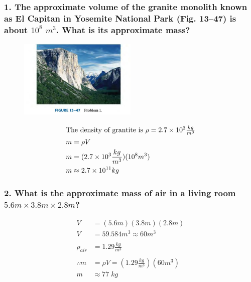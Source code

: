 \documentclass{article}
\begin{document}
\subsubsection*{
    1. The approximate volume of the granite monolith known as El Capitan
    in Yosemite National Park (Fig. 13–47) is about $10^8$ $m^3$. 
    What is its approximate mass?
}
\begin{figure}[h]
    \begin{center}
        \includegraphics[width=0.5\textwidth]{figures/p1.jpg}
    \end{center}
\end{figure}
\begin{align*}
    \intertext{The density of grantite is $\rho = 2.7 \times 10^3 \frac{kg}{m^3}$}
    m &= \rho V \\
    m &= (2.7 \times 10^3 \frac{kg}{m^3})(10^8 m^3) \\
    m &\approx 2.7 \times 10^{11} kg
\end{align*}
\subsubsection*{
    2.  What is the approximate mass of air in a living room $5.6m \times 3.8m \times 2.8m$?
}
\begin{align*}
    V &= (5.6m)(3.8m)(2.8m) \\
    V &= 59.584 m^3 \approx 60 m^3 \\\\
    \rho_{air} &= 1.29 \displaystyle\frac{kg}{m^3}\\\\
    \therefore m &= \rho V = (1.29 \displaystyle\frac{kg}{m^3})(60 m^3) \\
    m &\approx 77\;kg
\end{align*}
\end{document}
